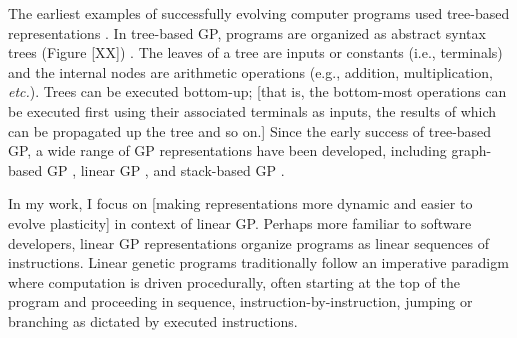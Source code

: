 
The earliest examples of successfully evolving computer programs used tree-based representations \citep{forsyth_beagle_1981,koza_hierarchical_1989}.
In tree-based GP, programs are organized as abstract syntax trees (Figure [XX]) \citep{poli_field_2008}.
The leaves of a tree are inputs or constants (i.e., terminals) and the internal nodes are arithmetic operations (e.g., addition, multiplication, \textit{etc.}).
Trees can be executed bottom-up; [that is, the bottom-most operations can be executed first using their associated terminals as inputs, the results of which can be propagated up the tree and so on.] 
Since the early success of tree-based GP, a wide range of GP representations have been developed, including graph-based GP \citep{miller_empirical_1999,kelly_multi-task_2017}, linear GP \citep{brameier_linear_2007}, and stack-based GP \citep{perkis_stack-based_1994,spector_autoconstructive_2001}. 

In my work, I focus on [making representations more dynamic and easier to evolve plasticity] in context of linear GP.
Perhaps more familiar to software developers, linear GP representations organize programs as linear sequences of instructions.
Linear genetic programs traditionally follow an imperative paradigm where computation is driven procedurally, often starting at the top of the program and proceeding in sequence, instruction-by-instruction, jumping or branching as dictated by executed instructions.







